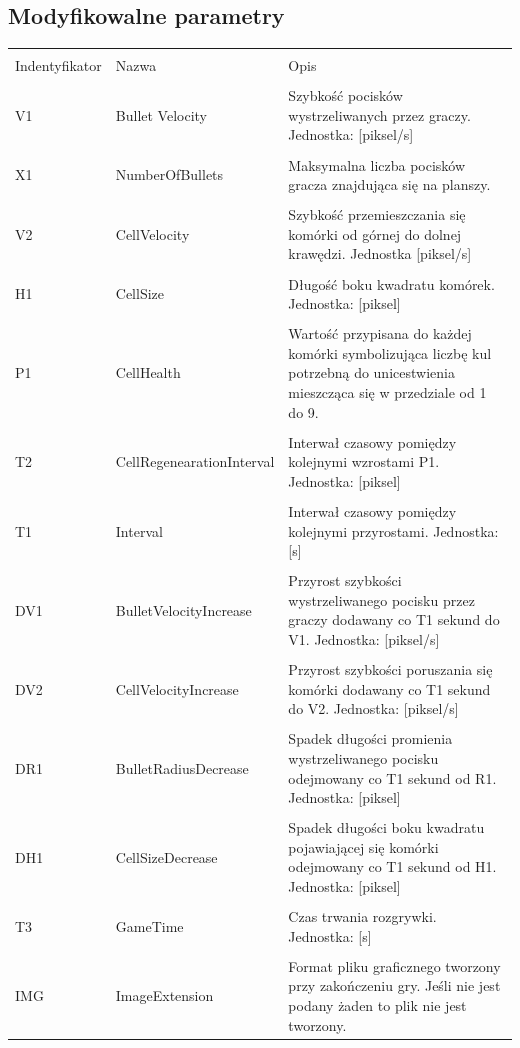 \documentclass[11pt,a4paper]{report}
\begin{document}
\subsection {Modyfikowalne parametry}
\begin{tabularx}{\linewidth}{  l|l|X  }
 \hline
 \\Indentyfikator                           &Nazwa			 &Opis\\
 \hline \hline
\\V1					& Bullet Velocity 		&Szybkość pocisków wystrzeliwanych przez graczy. Jednostka: [piksel/s] \\
 \hline
\\X1					&NumberOfBullets		&Maksymalna liczba pocisków gracza znajdująca się na planszy.\\
 \hline
\\V2					&CellVelocity			& Szybkość przemieszczania się komórki od górnej do dolnej krawędzi. Jednostka [piksel/s]\\
 \hline
\\H1 					&CellSize			& Długość boku kwadratu komórek. Jednostka: [piksel]\\
 \hline
\\P1 					&CellHealth 			&Wartość przypisana do każdej komórki symbolizująca liczbę kul potrzebną do unicestwienia mieszcząca się w przedziale od 1 do 9.  \\
 \hline
\\T2 					&CellRegenearationInterval	& Interwał czasowy pomiędzy kolejnymi wzrostami P1. Jednostka: [piksel]\\
 \hline
\\T1 					&Interval 			&Interwał czasowy pomiędzy kolejnymi przyrostami. Jednostka: [s]\\
 \hline
\\DV1 					&BulletVelocityIncrease 	&Przyrost szybkości wystrzeliwanego pocisku przez graczy dodawany co T1 sekund do V1. Jednostka: [piksel/s]\\
 \hline
\\DV2 					&CellVelocityIncrease 	&Przyrost szybkości poruszania się komórki dodawany co T1 sekund do V2. Jednostka: [piksel/s]\\
 \hline
\\DR1 					&BulletRadiusDecrease	&Spadek długości promienia wystrzeliwanego pocisku odejmowany co T1 sekund od R1. Jednostka: [piksel]\\
 \hline
\\DH1 					&CellSizeDecrease 		&Spadek długości boku kwadratu pojawiającej się komórki odejmowany co T1 sekund od H1. Jednostka: [piksel]\\
 \hline
\\T3 					&GameTime 			&Czas trwania rozgrywki. Jednostka: [s]\\
 \hline
\\IMG 					&ImageExtension 		&Format pliku graficznego tworzony przy zakończeniu gry. Jeśli nie jest podany żaden to plik nie jest tworzony.\\
 \hline
\end{tabularx}
\end{document}
